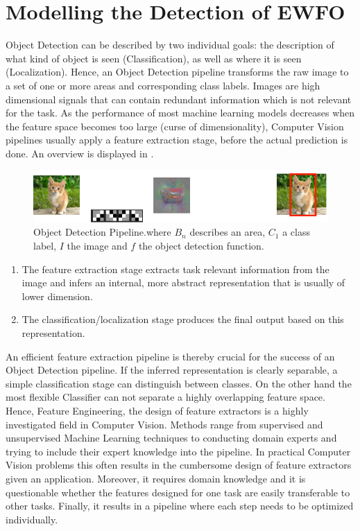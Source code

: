 	\chapter{Modelling the Detection of \ac{EWFO}}
	\label{sec:object_detection}
	
	Object Detection can be described by two individual goals: the description of what kind of object is seen (Classification), as well as where it is seen (Localization). Hence, an Object Detection pipeline transforms the raw image to a set of one or more areas and corresponding class labels. Images are high dimensional signals that can contain redundant information which is not relevant for the task. As the performance of most machine learning models decreases when the feature space becomes too large (curse of dimensionality), Computer Vision pipelines usually apply a feature extraction stage, before the actual prediction is done. An overview is displayed in .
	
	\begin{figure}[hbtp]
		
		\centering
		\includegraphics[width=\linewidth]{fig/ObjectDetection}
		\caption{Object Detection Pipeline.where $B_n$ describes an area, $C_1$ a class label, $I$ the image and $f$ the object detection function.}
		\label{fig:obj_pipeline}
	\end{figure}
	\begin{enumerate}
	\item The feature extraction stage extracts task relevant information from the image and infers an internal, more abstract representation that is usually of lower dimension.
	
	\item The classification/localization stage produces the final output based on this representation. 
	
	\end{enumerate}

	An efficient feature extraction pipeline is thereby crucial for the success of an Object Detection pipeline. If the inferred representation is clearly separable, a simple classification stage can distinguish between classes. On the other hand the most flexible Classifier can not separate a highly overlapping feature space. Hence, Feature Engineering, the design of feature extractors is a highly investigated field in Computer Vision. Methods range from supervised and unsupervised Machine Learning techniques to conducting domain experts and trying to include their expert knowledge into the pipeline. In practical Computer Vision problems this often results in the cumbersome design of feature extractors given an application. Moreover, it requires domain knowledge and it is questionable whether the features designed for one task are easily transferable to other tasks. Finally, it results in a pipeline where each step needs to be optimized individually.
	
